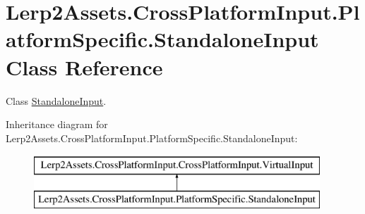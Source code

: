 \hypertarget{class_lerp2_assets_1_1_cross_platform_input_1_1_platform_specific_1_1_standalone_input}{}\section{Lerp2\+Assets.\+Cross\+Platform\+Input.\+Platform\+Specific.\+Standalone\+Input Class Reference}
\label{class_lerp2_assets_1_1_cross_platform_input_1_1_platform_specific_1_1_standalone_input}


Class \hyperlink{class_lerp2_assets_1_1_cross_platform_input_1_1_platform_specific_1_1_standalone_input}{Standalone\+Input}.  


Inheritance diagram for Lerp2\+Assets.\+Cross\+Platform\+Input.\+Platform\+Specific.\+Standalone\+Input\+:\begin{figure}[H]
\begin{center}
\leavevmode
\includegraphics[height=2.000000cm]{class_lerp2_assets_1_1_cross_platform_input_1_1_platform_specific_1_1_standalone_input}
\end{center}
\end{figure}
